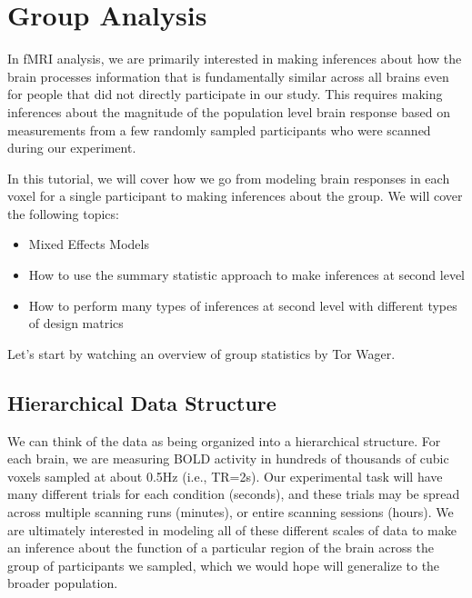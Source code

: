 \documentclass[letterpaper,10pt,english]{sphinxmanual}
\begin{document}
\section{Group Analysis}
\label{\detokenize{content/Group_Analysis:group-analysis}}\label{\detokenize{content/Group_Analysis::doc}}

In fMRI analysis, we are primarily interested in making inferences about how the brain processes information that is fundamentally similar across all brains even for people that did not directly participate in our study. This requires making inferences about the magnitude of the population level brain response based on measurements from a few randomly sampled participants who were scanned during our experiment.

In this tutorial, we will cover how we go from modeling brain responses in each voxel for a single participant to making inferences about the group. We will cover the following topics:
\begin{itemize}
\item {} 
Mixed Effects Models

\item {} 
How to use the summary statistic approach to make inferences at second level

\item {} 
How to perform many types of inferences at second level with different types of design matrics

\end{itemize}

Let’s start by watching an overview of group statistics by Tor Wager.

\begin{sphinxVerbatim}[commandchars=\\\{\}]
   

\end{sphinxVerbatim}

\noindent{}


\subsection{Hierarchical Data Structure}
\label{\detokenize{content/Group_Analysis:hierarchical-data-structure}}
We can think of the data as being organized into a hierarchical structure. For each brain, we are measuring BOLD activity in hundreds of thousands of cubic voxels sampled at about 0.5Hz (i.e., TR=2s). Our experimental task will have many different trials for each condition (seconds), and these trials may be spread across multiple scanning runs (minutes), or entire scanning sessions (hours). We are ultimately interested in modeling all of these different scales of data to make an inference about the function of a particular region of the brain across the group of participants we sampled, which we would hope will generalize to the broader population.
\end{document}
